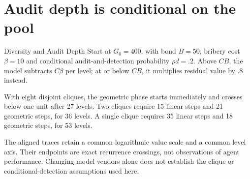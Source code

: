 \documentclass[11pt,a4paper,twoside]{article}
\begin{document}
\section*{Audit depth is conditional on the pool}
\begin{pdexample}{Diversity and Audit Depth}
Start at $G_0=400$, with bond $B=50$, bribery cost $\beta=10$ and
conditional audit-and-detection probability $\rho d=.2$.
Above $CB$, the model subtracts $C\beta$ per level; at or below $CB$, it
multiplies residual value by $.8$ instead.

With eight disjoint cliques, the geometric phase starts immediately and
crosses below one unit after 27 levels. Two cliques require 15 linear
steps and 21 geometric steps, for 36 levels. A single clique requires 35
linear steps and 18 geometric steps, for 53 levels.

The aligned traces retain a common logarithmic value scale and a common
level axis. Their endpoints are exact recurrence crossings, not observations
of agent performance. Changing model vendors alone does not establish the
clique or conditional-detection assumptions used here.
\end{pdexample}
\end{document}
